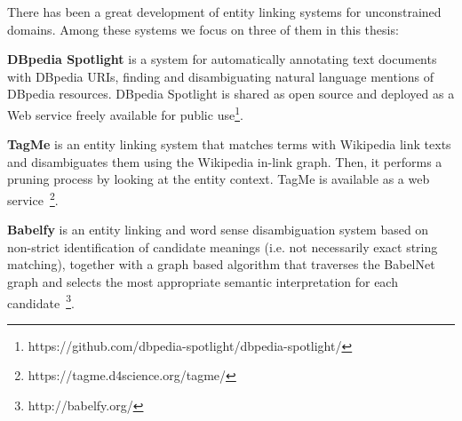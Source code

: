 There has been a great development of entity linking systems for unconstrained domains. Among these systems we focus on three of them in this thesis:

\noindent \textbf{DBpedia Spotlight} \citep{Mendes2011} is a system for automatically annotating text documents with DBpedia URIs, finding and disambiguating natural language mentions of DBpedia resources. DBpedia Spotlight is shared as open source and deployed as a Web service freely available for public use\footnote{https://github.com/dbpedia-spotlight/dbpedia-spotlight/}.

\noindent \textbf{TagMe} \citep{Ferragina2012} is an entity linking system that matches terms with Wikipedia link texts and disambiguates them using the Wikipedia in-link graph. Then, it performs a pruning process by looking at the entity context. TagMe is available as a web service~\footnote{https://tagme.d4science.org/tagme/}.

\noindent \textbf{Babelfy} \citep{Moroetal2014b} is an entity linking and word sense disambiguation system based on non-strict identification of candidate meanings (i.e. not necessarily exact string matching), together with a graph based algorithm that traverses the BabelNet graph and selects the most appropriate semantic interpretation for each candidate~\footnote{http://babelfy.org/}.

